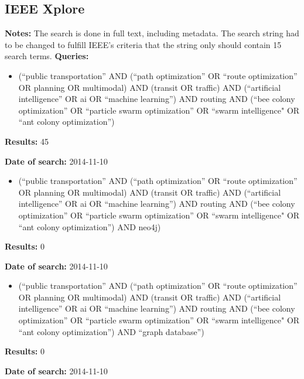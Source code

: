 \subsection{IEEE Xplore}
\par \textbf{Notes:} The search is done in full text, including metadata. The search string had to be changed to fulfill IEEE's criteria that the string only should contain 15 search terms. 
\newline
\newline 
\textbf{Queries:}
\begin{itemize}
	\item(``public transportation'' AND (``path optimization'' OR ``route optimization'' OR planning OR multimodal) AND (transit OR traffic) AND (``artificial intelligence'' OR ai OR ``machine learning'') AND routing AND (``bee colony optimization'' OR ``particle swarm optimization'' OR ``swarm intelligence" OR ``ant colony optimization'')
\end{itemize}
\par \textbf{Results:} 45
\par \textbf{Date of search:} 2014-11-10 
\begin{itemize}
	\item(``public transportation'' AND (``path optimization'' OR ``route optimization'' OR planning OR multimodal) AND (transit OR traffic) AND (``artificial intelligence'' OR ai OR ``machine learning'') AND routing AND (``bee colony optimization'' OR ``particle swarm optimization'' OR ``swarm intelligence" OR ``ant colony optimization'') AND neo4j)
\end{itemize}
\par \textbf{Results:} 0
\par \textbf{Date of search:} 2014-11-10 
\begin{itemize}
		\item(``public transportation'' AND (``path optimization'' OR ``route optimization'' OR planning OR multimodal) AND (transit OR traffic) AND (``artificial intelligence'' OR ai OR ``machine learning'') AND routing AND (``bee colony optimization'' OR ``particle swarm optimization'' OR ``swarm intelligence" OR ``ant colony optimization'') AND ``graph database'')
\end{itemize}
\par \textbf{Results:} 0
\par \textbf{Date of search:} 2014-11-10 


